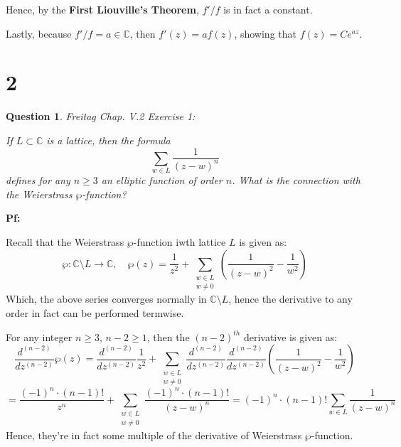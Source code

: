 \documentclass{article}
\newtheorem{question}{Question}
\begin{document}
Hence, by the \textbf{First Liouville's Theorem}, $f'/f$ is in fact a constant.

Lastly, because $f'/f = a\in\mathbb{C}$, then $f'(z)=af(z)$, showing that $f(z)=Ce^{az}$.

\break

\section*{2}
\begin{myBox}[]{}
    \begin{question}
        Freitag Chap. V.2 Exercise 1:

        If $L\subset \mathbb{C}$ is a lattice, then the formula
        $$\sum_{w\in L}\frac{1}{(z-w)^n}$$
        defines for any $n\geq 3$ an elliptic function of order $n$. What is the connection with the Weierstrass $\wp$-function?
    \end{question}
\end{myBox}

\textbf{Pf:}

Recall that the Weierstrass $\wp$-function iwth lattice $L$ is given as:
$$\wp:\mathbb{C}\setminus L\rightarrow\mathbb{C},\quad \wp(z)=\frac{1}{z^2}+\sum_{\substack{w\in L \\ w\neq 0}}\left(\frac{1}{(z-w)^2}-\frac{1}{w^2}\right)$$
Which, the above series converges normally in $\mathbb{C}\setminus L$, hence the derivative to any order in fact can be performed termwise.

For any integer $n\geq 3$, $n-2\geq 1$, then the $(n-2)^{th}$ derivative is given as:
$$\frac{d^{(n-2)}}{dz^{(n-2)}}\wp(z)=\frac{d^{(n-2)}}{dz^{(n-2)}}\frac{1}{z^2}+\sum_{\substack{w\in L \\ w\neq 0}}\frac{d^{(n-2)}}{dz^{(n-2)}}\frac{d^{(n-2)}}{dz^{(n-2)}}\left(\frac{1}{(z-w)^2}-\frac{1}{w^2}\right)$$
$$ = \frac{(-1)^n\cdot (n-1)!}{z^n}+\sum_{\substack{w\in L \\ w\neq 0}}\frac{(-1)^n\cdot(n-1)!}{(z-w)^n} = (-1)^n\cdot(n-1)!\sum_{w\in L}\frac{1}{(z-w)^n}$$
Hence, they're in fact some multiple of the derivative of Weierstrass $\wp$-function.

\break
\end{document}
